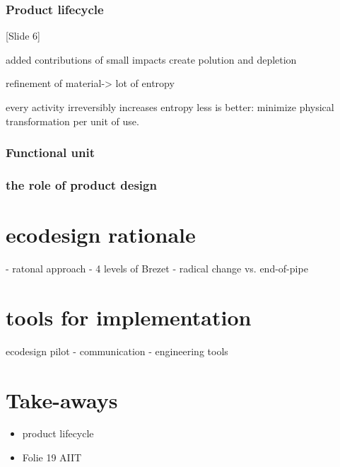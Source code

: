 \documentclass{article}
\begin{document}
\subsubsection{Product lifecycle}
\label{sec:plc}


{\color{blue}[Slide 6]}

added contributions of small impacts create polution and depletion


refinement of material-> lot of entropy

every activity irreversibly increases entropy
less is better: minimize physical transformation per unit of use. 

\subsubsection{Functional unit}
\label{sec:fu}

\subsubsection{the role of product design}
\label{sec:productdesign}





\section{ecodesign rationale}
\label{sec:ecodesignRationale}
 - ratonal approach
 - 4 levels of Brezet
 - radical change vs. end-of-pipe 

\section{tools for implementation}
\label{sec:tools}
ecodesign pilot - communication - engineering tools


\section{Take-aways}
\label{sec:TakeAways}
\begin{itemize}
	\item product lifecycle
	\item Folie 19 AIIT
\end{itemize}



\end{document}
